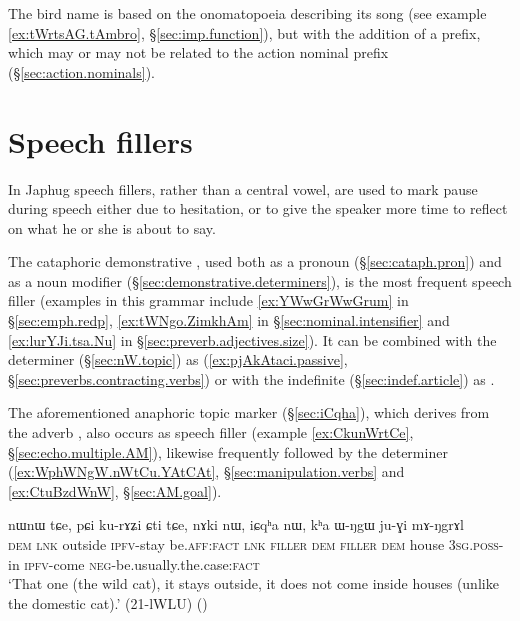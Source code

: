 The bird name  is based on the onomatopoeia describing its song (see example \ref{ex:tWrtsAG.tAmbro}, §\ref{sec:imp.function}), but with the addition of a  prefix, which may or may not be related to the action nominal  prefix (§\ref{sec:action.nominals}).

\section{Speech fillers} \label{sec:fillers}
In Japhug speech fillers, rather than a central vowel, are used to mark pause during speech either due to hesitation, or to give the speaker more time to reflect on what he or she is about to say.

The cataphoric demonstrative , used both as a pronoun (§\ref{sec:cataph.pron}) and as a noun modifier (§\ref{sec:demonstrative.determiners}), is the most frequent speech filler (examples in this grammar include \ref{ex:YWwGrWwGrum} in §\ref{sec:emph.redp}, \ref{ex:tWNgo.ZimkhAm} in §\ref{sec:nominal.intensifier} and \ref{ex:lurYJi.tsa.Nu} in §\ref{sec:preverb.adjectives.size}). It can be combined with the determiner  (§\ref{sec:nW.topic}) as  (\ref{ex:pjAkAtaci.passive}, §\ref{sec:preverbs.contracting.verbs}) or with the indefinite  (§\ref{sec:indef.article}) as . 
  
The aforementioned anaphoric topic marker  (§\ref{sec:iCqha}), which derives from the adverb , also occurs as speech filler (example \ref{ex:CkunWrtCe}, §\ref{sec:echo.multiple.AM}), likewise frequently followed by the determiner  (\ref{ex:WphWNgW.nWtCu.YAtCAt}, §\ref{sec:manipulation.verbs} and \ref{ex:CtuBzdWnW}, §\ref{sec:AM.goal}).


\begin{exe}
\ex \label{ex:nAkinW.iCqhanW}
\gll nɯnɯ tɕe, pɕi ku-rɤʑi ɕti tɕe, nɤki nɯ, iɕqʰa nɯ, kʰa ɯ-ŋgɯ ju-ɣi mɤ-ŋgrɤl \\
\textsc{dem} \textsc{lnk} outside \textsc{ipfv}-stay be.\textsc{aff}:\textsc{fact} \textsc{lnk} \textsc{filler} \textsc{dem} \textsc{filler} \textsc{dem} house \textsc{3sg}.\textsc{poss}-in \textsc{ipfv}-come \textsc{neg}-be.usually.the.case:\textsc{fact} \\
\glt `That one (the wild cat), it stays outside, it does not come inside houses (unlike the domestic cat).' (21-lWLU) 	()
\end{exe}

